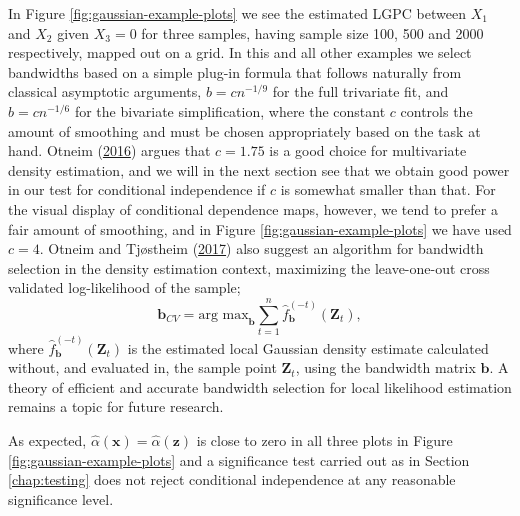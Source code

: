 \documentclass[
  12pt,
  letterpaper]{article}
\newcommand{\x}{\bm{x}}
\newcommand{\Z}{\bm{Z}}
\newcommand{\z}{\bm{z}}
\newcommand{\bb}{\bm{b}}
\theoremstyle{definition}
\theoremstyle{definition}
\theoremstyle{definition}
\theoremstyle{remark}
\begin{document}
In Figure \ref{fig:gaussian-example-plots} we see the estimated LGPC between \(X_1\) and \(X_2\) given \(X_3=0\) for three samples, having sample size 100, 500 and 2000 respectively, mapped out on a grid. In this and all other examples we select bandwidths based on a simple plug-in formula that follows naturally from classical asymptotic arguments, \(b = cn^{-1/9}\) for the full trivariate fit, and \(b = cn^{-1/6}\) for the bivariate simplification, where the constant \(c\) controls the amount of smoothing and must be chosen appropriately based on the task at hand. Otneim (\protect\hyperlink{ref-otneim2016multivariate}{2016}) argues that \(c=1.75\) is a good choice for multivariate density estimation, and we will in the next section see that we obtain good power in our test for conditional independence if \(c\) is somewhat smaller than that. For the visual display of conditional dependence maps, however, we tend to prefer a fair amount of smoothing, and in Figure \ref{fig:gaussian-example-plots} we have used \(c=4\). Otneim and Tjøstheim (\protect\hyperlink{ref-otneim2017locally}{2017}) also suggest an algorithm for bandwidth selection in the density estimation context, maximizing the leave-one-out cross validated log-likelihood of the sample;
\[\bb_{CV} = \textrm{arg max}_{\bb} \sum_{t = 1}^n \widehat{f}_{\bb}^{(-t)}(\Z_t),\]
where \(\widehat f_{\bb}^{(-t)}(\Z_t)\) is the estimated local Gaussian density estimate calculated without, and evaluated in, the sample point \(\Z_t\), using the bandwidth matrix \(\bb\). A theory of efficient and accurate bandwidth selection for local likelihood estimation remains a topic for future research.

As expected, \(\widehat\alpha(\x) = \widehat\alpha(\z)\) is close to zero in all three plots in Figure \ref{fig:gaussian-example-plots} and a significance test carried out as in Section \ref{chap:testing} does not reject conditional independence at any reasonable significance level.
\end{document}
